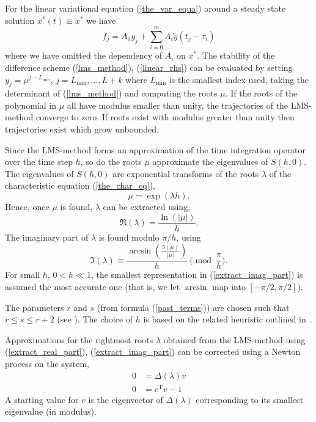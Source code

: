 \documentclass[10pt]{scrartcl}
\newcommand{\T}{\mathrm{T}}
\begin{document}
{For the linear variational equation (\ref{the_var_equa})
around a steady state solution $x^*(t)\equiv x^*$
we have
\begin{equation}\label{linear_rhs}
f_j=A_0y_j+\sum_{i=0}^mA_i\tilde{y}(t_j-\tau_i)
\end{equation}
where we have omitted the dependency of $A_i$ on $x^*$.
The stability of the difference scheme (\ref{lms_method}), (\ref{linear_rhs})
can be evaluated by setting $y_j=\mu^{j-L_{\min}}$, $j=L_{\min},\ldots,L+k$ 
where $L_{\min}$ is the 
smallest index used, taking the determinant of (\ref{lms_method})
and computing the roots $\mu$. If the roots of the
polynomial in $\mu$ all have modulus smaller than unity, the trajectories
of the LMS-method converge to zero. 
If roots exist with modulus greater than unity then trajectories exist
which grow unbounded.

Since the LMS-method forms an approximation of
the time integration operator over the time step $h$, so do the 
roots $\mu$ approximate the eigenvalues of $S(h,0)$.
The eigenvalues of $S(h,0)$ are exponential transforms of
the roots $\lambda$ of the characteristic 
equation (\ref{the_char_eq}),
\[
\mu=\exp(\lambda h).
\]
Hence, once $\mu$ is found, $\lambda$ can be extracted using,
\begin{equation}\label{extract_real_part}
\Re(\lambda)=\frac{\ln(|\mu|)}{h}.
\end{equation}
The imaginary part of $\lambda$ is found modulo $\pi/h$, using
\begin{equation}\label{extract_imag_part}
\Im(\lambda)\equiv\frac{\arcsin(\frac{\Im(\mu)}{|\mu|})}
{h}\!\!\!\!\pmod{\frac{\pi}{h}}.
\end{equation}
For small $h$, $0<h\ll 1$, the smallest representation 
in (\ref{extract_imag_part})
is assumed the most accurate one (that is, we let $\arcsin$
map into $[-\pi/2,\pi/2]$).

The parameters $r$ and $s$ (from formula (\ref{past_terms}))
are chosen such that $r\leq s\leq r+2$ (see \cite{Hong96}).
The choice of $h$ is based on the related 
heuristic outlined in \cite{engel01}.

Approximations for the rightmost roots $\lambda$ obtained
from the LMS-method using (\ref{extract_real_part}), 
(\ref{extract_imag_part}) can be corrected
using a Newton process on the system,
\begin{equation}\label{determ_root}
\begin{aligned}
0&=\Delta(\lambda)v \\
0&=c^\T v-1
\end{aligned}
\end{equation}
A starting value for $v$ is the eigenvector of 
$\Delta(\lambda)$ corresponding to its smallest eigenvalue (in modulus).

}
\end{document}
